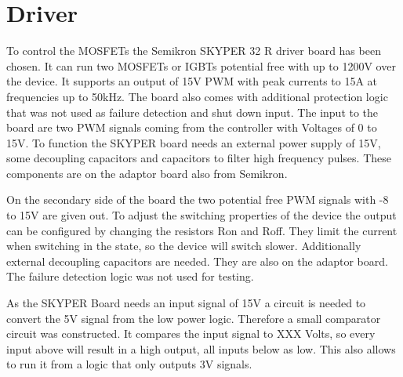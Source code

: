 \section{Driver}\label{sec:driver}

To control the MOSFETs the Semikron SKYPER 32 R driver board has been chosen.
It can run two MOSFETs or IGBTs potential free with up to 1200V over the device.
It supports an output of 15V PWM with peak currents to 15A at frequencies up to 50kHz.
The board also comes with additional protection logic that was not used as failure detection and shut down input.
The input to the board are two PWM signals coming from the controller with Voltages of 0 to 15V.
To function the SKYPER board needs an external power supply of 15V,
some decoupling capacitors and capacitors to filter high frequency pulses.
These components are on the adaptor board also from Semikron.


On the secondary side of the board the two potential free PWM signals with -8 to 15V are given out.
To adjust the switching properties of the device the output can be configured by changing the resistors Ron and Roff.
They limit the current when switching in the state, so the device will switch slower.
Additionally external decoupling capacitors are needed. They are also on the adaptor board.
The failure detection logic was not used for testing.




As the SKYPER Board needs an input signal of 15V a circuit is needed to convert the 5V signal from the low power logic.
Therefore a small comparator circuit was constructed.
It compares the input signal to XXX Volts, so every input above will result in a high output,
all inputs below as low.
This also allows to run it from a logic that only outputs 3V signals.